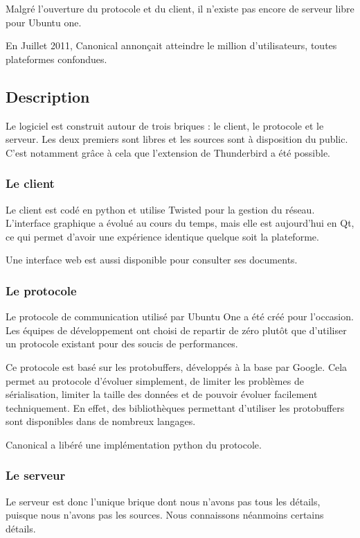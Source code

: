 Malgré l'ouverture du protocole et du client, il n'existe pas encore de serveur libre pour Ubuntu one.

En Juillet 2011, Canonical annonçait atteindre le million d'utilisateurs, toutes plateformes confondues.

\subsection{Description}
Le logiciel est construit autour de trois briques : le client, le protocole et le serveur. Les deux premiers sont libres et les sources sont à disposition du public. C'est notamment grâce à cela que l'extension de Thunderbird a été possible.

\subsubsection{Le client}
Le client est codé en python et utilise Twisted pour la gestion du réseau. L'interface graphique a évolué au cours du temps, mais elle est aujourd'hui en Qt, ce qui permet d'avoir une expérience identique quelque soit la plateforme.

Une interface web est aussi disponible pour consulter ses documents.

\subsubsection{Le protocole}

Le protocole de communication utilisé par Ubuntu One a été créé pour l'occasion. Les équipes de développement ont choisi de repartir de zéro plutôt que d'utiliser un protocole existant pour des soucis de performances.

Ce protocole est basé sur les protobuffers, développés à la base par Google. Cela permet au protocole d'évoluer simplement, de limiter les problèmes de sérialisation, limiter la taille des données et de pouvoir évoluer facilement techniquement. En effet, des bibliothèques permettant d'utiliser les protobuffers sont disponibles dans de nombreux langages.

Canonical a libéré une implémentation python du protocole.

\subsubsection{Le serveur}

Le serveur est donc l'unique brique dont nous n'avons pas tous les détails, puisque nous n'avons pas les sources. Nous connaissons néanmoins certains détails.

